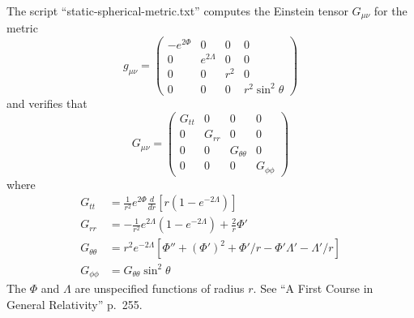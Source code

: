 \documentclass[12pt]{article}
\begin{document}
\noindent
The script ``static-spherical-metric.txt''
computes the Einstein tensor $G_{\mu\nu}$ for the metric
$$
g_{\mu\nu}=
\begin{pmatrix}
-e^{2\Phi} & 0 & 0 & 0\\
0 & e^{2\Lambda} & 0 & 0\\
0 & 0 & r^2 & 0\\
0 & 0 & 0 & r^2\sin^2\theta
\end{pmatrix}
$$
and verifies that
$$
G_{\mu\nu}=\begin{pmatrix}
G_{tt} & 0 & 0 & 0\\
0 & G_{rr} & 0 & 0\\
0 & 0 & G_{\theta\theta} & 0\\
0 & 0 & 0 & G_{\phi\phi}
\end{pmatrix}
$$
where
\begin{align*}
G_{tt}&=\frac{1}{r^2}e^{2\Phi}\frac{d}{dr}[r(1-e^{-2\Lambda})]
\\[2ex]
G_{rr}&=-\frac{1}{r^2}e^{2\Lambda}(1-e^{-2\Lambda})+\frac{2}{r}\Phi'
\\[2ex]
G_{\theta\theta}&=r^2e^{-2\Lambda}\left[\Phi''+(\Phi')^2+\Phi'/r-\Phi'\Lambda'-\Lambda'/r\right]
\\[2ex]
G_{\phi\phi}&=G_{\theta\theta}\sin^2\theta
\end{align*}
The $\Phi$ and $\Lambda$ are unspecified functions of radius $r$.
See ``A First Course in General Relativity'' p.~255.
\end{document}
